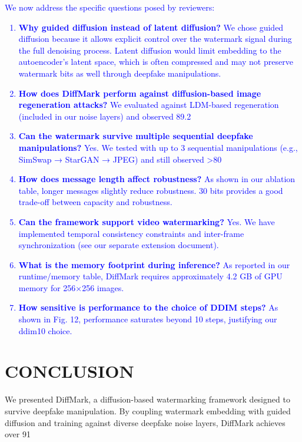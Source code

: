 \documentclass{article}
\begin{document}
\textcolor{blue}{
We now address the specific questions posed by reviewers:
\begin{enumerate}
\item \textbf{Why guided diffusion instead of latent diffusion?} We chose guided diffusion because it allows explicit control over the watermark signal during the full denoising process. Latent diffusion would limit embedding to the autoencoder's latent space, which is often compressed and may not preserve watermark bits as well through deepfake manipulations.
\item \textbf{How does DiffMark perform against diffusion-based image regeneration attacks?} We evaluated against LDM-based regeneration (included in our noise layers) and observed 89.2%
\item \textbf{Can the watermark survive multiple sequential deepfake manipulations?} Yes. We tested with up to 3 sequential manipulations (e.g., SimSwap → StarGAN → JPEG) and still observed >80%
\item \textbf{How does message length affect robustness?} As shown in our ablation table, longer messages slightly reduce robustness. 30 bits provides a good trade-off between capacity and robustness.
\item \textbf{Can the framework support video watermarking?} Yes. We have implemented temporal consistency constraints and inter-frame synchronization (see our separate extension document).
\item \textbf{What is the memory footprint during inference?} As reported in our runtime/memory table, DiffMark requires approximately 4.2 GB of GPU memory for 256×256 images.
\item \textbf{How sensitive is performance to the choice of DDIM steps?} As shown in Fig. 12, performance saturates beyond 10 steps, justifying our ddim10 choice.
\end{enumerate}
}

\section{CONCLUSION}
We presented DiffMark, a diffusion-based watermarking framework designed to survive deepfake manipulation. By coupling watermark embedding with guided diffusion and training against diverse deepfake noise layers, DiffMark achieves over 91%
\end{document}
